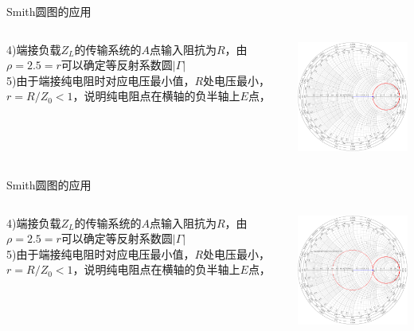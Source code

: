 \begin{frame}{Smith圆图的应用}
  \begin{columns}
    \begin{column}{0.4\linewidth}
      4)\quad 端接负载$Z_L$的传输系统的$A$点输入阻抗为$R$，由$\rho=2.5=r$可以确定等反射系数圆$\lvert\Gamma\rvert$\\
      5)\quad 由于端接纯电阻时对应电压最小值，$R$处电压最小，$r=R/Z_0<1$，说明纯电阻点在横轴的负半轴上$E$点，
    \end{column}
    \begin{column}{0.6\linewidth}
      \includegraphics[width=7cm]{Cha4//fig4-17-4.pdf}
    \end{column}
  \end{columns}
\end{frame}

\begin{frame}{Smith圆图的应用}
  \begin{columns}
    \begin{column}{0.4\linewidth}
      4)\quad 端接负载$Z_L$的传输系统的$A$点输入阻抗为$R$，由$\rho=2.5=r$可以确定等反射系数圆$\lvert\Gamma\rvert$\\
      5)\quad 由于端接纯电阻时对应电压最小值，$R$处电压最小，$r=R/Z_0<1$，说明纯电阻点在横轴的负半轴上$E$点，
    \end{column}
    \begin{column}{0.6\linewidth}
      \includegraphics[width=7cm]{Cha4//fig4-17-5.pdf}
    \end{column}
  \end{columns}
\end{frame}

